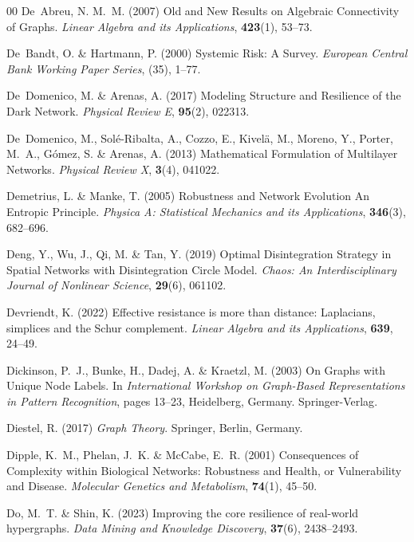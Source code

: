 \documentclass{comnet-mod}
\begin{document}
\begin{thebibliography}{00}
De~Abreu, N. M.~M. (2007)  {Old and New Results on Algebraic Connectivity of
  Graphs}. {\em {Linear Algebra and its Applications}}, \textbf{423}(1),
  53--73.

De~Bandt, O. {\&} Hartmann, P. (2000)  {Systemic Risk: {{A}} Survey}. {\em
  {European Central Bank Working Paper Series}}, (35), 1--77.

De~Domenico, M. {\&} Arenas, A. (2017)  {Modeling Structure and Resilience of
  the Dark Network}. {\em {Physical Review E}}, \textbf{95}(2), 022313.

De~Domenico, M., {Sol{\'e}-Ribalta}, A., Cozzo, E., Kivel{\"a}, M., Moreno, Y.,
  Porter, M.~A., G{\'o}mez, S. {\&} Arenas, A. (2013)  {Mathematical
  Formulation of Multilayer Networks}. {\em {Physical Review X}},
  \textbf{3}(4), 041022.

Demetrius, L. {\&} Manke, T. (2005)  {Robustness and Network Evolution
  \textemdash{} {{An}} Entropic Principle}. {\em {Physica A: Statistical
  Mechanics and its Applications}}, \textbf{346}(3), 682--696.

Deng, Y., Wu, J., Qi, M. {\&} Tan, Y. (2019)  {Optimal Disintegration Strategy
  in Spatial Networks with Disintegration Circle Model}. {\em {Chaos: An
  Interdisciplinary Journal of Nonlinear Science}}, \textbf{29}(6), 061102.

Devriendt, K. (2022)  {Effective resistance is more than distance: Laplacians,
  simplices and the Schur complement}. {\em {Linear Algebra and its
  Applications}}, \textbf{639}, 24--49.

Dickinson, P.~J., Bunke, H., Dadej, A. {\&} Kraetzl, M. (2003)  {On Graphs with
  Unique Node Labels}. In {\em {International Workshop on Graph-Based
  Representations in Pattern Recognition}}, pages 13--23, Heidelberg, Germany.
  {Springer-Verlag}.

Diestel, R. (2017) {\em {Graph Theory}}.
{Springer}, {Berlin, Germany}.

Dipple, K.~M., Phelan, J.~K. {\&} McCabe, E.~R. (2001)  {Consequences of
  Complexity within Biological Networks: {{Robustness}} and Health, or
  Vulnerability and Disease}. {\em {Molecular Genetics and Metabolism}},
  \textbf{74}(1), 45--50.

Do, M.~T. {\&} Shin, K. (2023)  Improving the core resilience of real-world
  hypergraphs. {\em {Data Mining and Knowledge Discovery}}, \textbf{37}(6),
  2438--2493.


\end{thebibliography}
\end{document}
